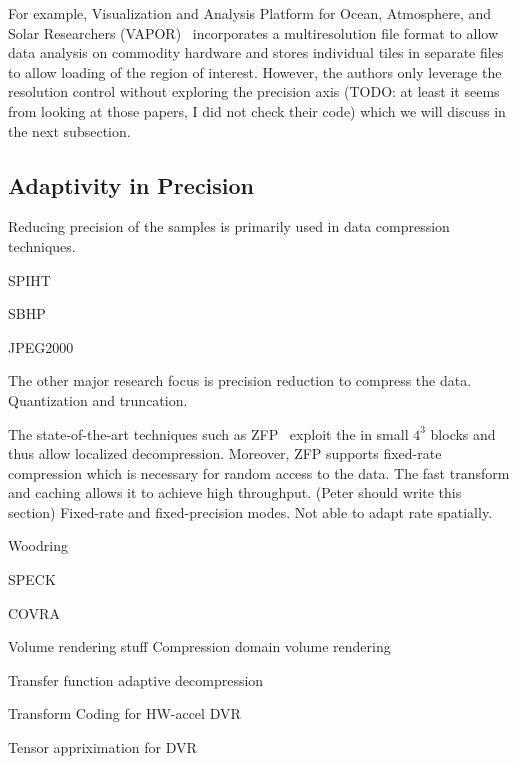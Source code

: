 For example, Visualization and Analysis Platform for Ocean, Atmosphere, and Solar Researchers
(VAPOR)~\cite{multires_toolkit2003, vapor2007} incorporates a multiresolution file
format to allow data analysis on commodity hardware and stores individual tiles in
separate files to allow loading of the region of interest.
However, the authors only leverage the resolution control without exploring the precision axis
(TODO: at least it seems from looking at those papers, I did not check their code) which
we will discuss in the next subsection.


\subsection{Adaptivity in Precision}
Reducing precision of the samples is primarily used in data compression techniques. 

SPIHT~\cite{spiht1996}


SBHP~\cite{sbhp2000}

JPEG2000~\cite{jpeg2001}


The other major research focus is precision reduction to compress the data. Quantization and
truncation.



The state-of-the-art techniques such as ZFP~\cite{zfp2014} exploit the in small $4^3$ blocks
and thus allow localized decompression. Moreover, ZFP supports fixed-rate compression which
is necessary for random access to the data. The fast transform and caching allows it to
achieve high throughput. (Peter should write this section)
Fixed-rate and fixed-precision modes. Not able to adapt rate spatially.


Woodring~\cite{woodring2011}


SPECK~\cite{speck2004}

COVRA~\cite{covra2012}


Volume rendering stuff
Compression domain volume rendering~\cite{compression_domain2003}

Transfer function adaptive decompression~\cite{tf_decompression2004}

Transform Coding for HW-accel DVR~\cite{hw_dvr2007}

Tensor appriximation for DVR~\cite{tensor_dvr2015}



